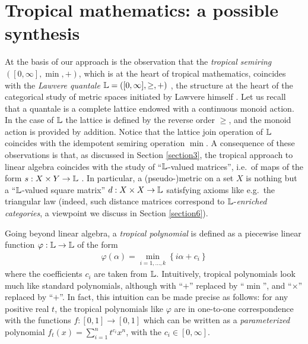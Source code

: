  
\section{Tropical mathematics: a possible synthesis}

At the basis of our approach is the observation that the \emph{tropical semiring} $([0,\infty], \min, +)$, which is at the heart of tropical mathematics, coincides with the \emph{Lawvere quantale} $\mathbb{L}=([0,\infty], \geq, +)$ \cite{}, the structure at the heart of the categorical study of metric spaces initiated by Lawvere himself \cite{}.
Let us recall that a quantale is a complete lattice endowed with a continuous monoid action. In the case of $\mathbb{L}$ the lattice is defined by the reverse order $\geq$, and the monoid action is provided by addition. Notice that the lattice join operation of $\mathbb{L}$ coincides with the idempotent semiring operation $\min$. 
A consequence of these observations is that, as discussed in Section \ref{section3}, the tropical approach to linear algebra coincides with the study of ``$\mathbb{L}$-valued matrices'', i.e.~of maps of the form $s: X\times Y\to \mathbb{L}$ .
In particular, a (pseudo-)metric on a set $X$ is nothing but a ``$\mathbb{L}$-valued square matrix'' $d:X\times X\to \mathbb{L}$ satisfying axioms like e.g.~the triangular law (indeed, such distance matrices correspond to $\mathbb{L}$-\emph{enriched categories}, a viewpoint we discuss in Section \ref{section6}). 

Going beyond linear algebra, a \emph{tropical polynomial} is defined as a piecewise linear function $\varphi:\mathbb{L}\to \mathbb{L}$ of the form 
\begin{align}\label{eq:polytrop}
\varphi(\alpha)= \min_{i=1,\dots,k}\left\{ i\alpha + c_{i}\right\}
\end{align}
where the coefficients $c_{i}$ are taken from $\mathbb{L}$. 
%
Intuitively, tropical polynomials look much like standard polynomials, although with ``$+$'' replaced by ``$\min$'', and ``$\times$'' replaced by ``$+$''. 
In fact, this intuition can be made precise as follows: for any positive real $t$, the tropical polynomials like $\varphi$ are in one-to-one correspondence with the functions $f:[0,1]\to [0,1]$ which can be written as a \emph{parameterized} polynomial 
$f_{t}(x)= \sum_{i=1}^{n}t^{c_{i}}x^{n}$, with the $c_{i}\in [0,\infty]$. 






